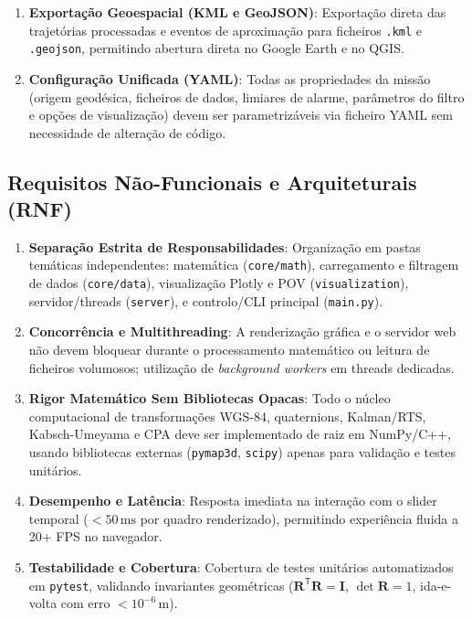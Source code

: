 \documentclass[11pt,a4paper]{article}
\newcommand{\Rot}{\mathbf{R}}
\newcommand{\Id}{\mathbf{I}}
\newcommand{\T}{^{\mathsf{T}}}
\begin{document}
\begin{enumerate}[label=\textbf{RF\arabic*:},leftmargin=1.5cm]
    \item \textbf{Exportação Geoespacial (KML e GeoJSON)}: Exportação direta das trajetórias processadas e eventos de aproximação para ficheiros \texttt{.kml} e \texttt{.geojson}, permitindo abertura direta no Google Earth e no QGIS.
    \item \textbf{Configuração Unificada (YAML)}: Todas as propriedades da missão (origem geodésica, ficheiros de dados, limiares de alarme, parâmetros do filtro e opções de visualização) devem ser parametrizáveis via ficheiro YAML sem necessidade de alteração de código.
\end{enumerate}

\subsection{Requisitos Não-Funcionais e Arquiteturais (RNF)}

\begin{enumerate}[label=\textbf{RNF\arabic*:},leftmargin=1.5cm]
    \item \textbf{Separação Estrita de Responsabilidades}: Organização em pastas temáticas independentes: matemática (\texttt{core/math}), carregamento e filtragem de dados (\texttt{core/data}), visualização Plotly e POV (\texttt{visualization}), servidor/threads (\texttt{server}), e controlo/CLI principal (\texttt{main.py}).
    \item \textbf{Concorrência e Multithreading}: A renderização gráfica e o servidor web não devem bloquear durante o processamento matemático ou leitura de ficheiros volumosos; utilização de \textit{background workers} em threads dedicadas.
    \item \textbf{Rigor Matemático Sem Bibliotecas Opacas}: Todo o núcleo computacional de transformações WGS-84, quaternions, Kalman/RTS, Kabsch-Umeyama e CPA deve ser implementado de raiz em NumPy/C++, usando bibliotecas externas (\texttt{pymap3d}, \texttt{scipy}) apenas para validação e testes unitários.
    \item \textbf{Desempenho e Latência}: Resposta imediata na interação com o slider temporal ($< 50\,\text{ms}$ por quadro renderizado), permitindo experiência fluida a 20+ FPS no navegador.
    \item \textbf{Testabilidade e Cobertura}: Cobertura de testes unitários automatizados em \texttt{pytest}, validando invariantes geométricas ($\Rot\T\Rot = \Id$, $\det\Rot = 1$, ida-e-volta com erro $< 10^{-6}\,\text{m}$).
\end{enumerate}
\end{document}
